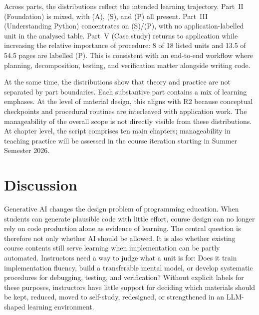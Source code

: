 \documentclass{article}
\begin{document}
Across parts, the distributions reflect the intended learning trajectory. Part~II (Foundation) is mixed, with (A), (S), and (P) all present. Part~III (Understanding Python) concentrates on (S)/(P), with no application-labelled unit in the analysed table. Part~V (Case study) returns to application while increasing the relative importance of procedure: 8 of 18 listed units and 13.5 of 54.5 pages are labelled (P). This is consistent with an end-to-end workflow where planning, decomposition, testing, and verification matter alongside writing code.\par
At the same time, the distributions show that theory and practice are not separated by part boundaries. Each substantive part contains a mix of learning emphases. At the level of material design, this aligns with R2 because conceptual checkpoints and procedural routines are interleaved with application work. The manageability of the overall scope is not directly visible from these distributions. At chapter level, the script comprises ten main chapters; manageability in teaching practice will be assessed in the course iteration starting in Summer Semester 2026.\par






\section{Discussion}
\label{sec:discussion}
Generative AI changes the design problem of programming education. When students can generate plausible code with little effort, course design can no longer rely on code production alone as evidence of learning. The central question is therefore not only whether AI should be allowed. It is also whether existing course contents still serve learning when implementation can be partly automated. Instructors need a way to judge what a unit is for: Does it train implementation fluency, build a transferable mental model, or develop systematic procedures for debugging, testing, and verification? Without explicit labels for these purposes, instructors have little support for deciding which materials should be kept, reduced, moved to self-study, redesigned, or strengthened in an LLM-shaped learning environment.\par
\end{document}
